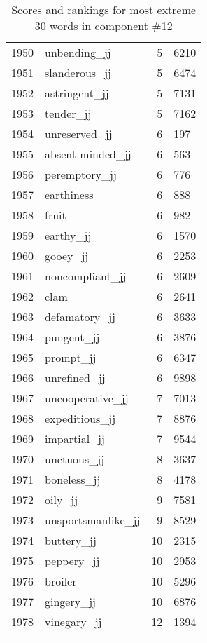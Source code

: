 \begin{longtable}[!htbp]{| rlr@{.}l |}
    1950 & unbending\_jj & 5 & 6210 \\
    1951 & slanderous\_jj & 5 & 6474 \\
    1952 & astringent\_jj & 5 & 7131 \\
    1953 & tender\_jj & 5 & 7162 \\
    1954 & unreserved\_jj & 6 & 197 \\
    1955 & absent-minded\_jj & 6 & 563 \\
    1956 & peremptory\_jj & 6 & 776 \\
    1957 & earthiness & 6 & 888 \\
    1958 & fruit & 6 & 982 \\
    1959 & earthy\_jj & 6 & 1570 \\
    1960 & gooey\_jj & 6 & 2253 \\
    1961 & noncompliant\_jj & 6 & 2609 \\
    1962 & clam & 6 & 2641 \\
    1963 & defamatory\_jj & 6 & 3633 \\
    1964 & pungent\_jj & 6 & 3876 \\
    1965 & prompt\_jj & 6 & 6347 \\
    1966 & unrefined\_jj & 6 & 9898 \\
    1967 & uncooperative\_jj & 7 & 7013 \\
    1968 & expeditious\_jj & 7 & 8876 \\
    1969 & impartial\_jj & 7 & 9544 \\
    1970 & unctuous\_jj & 8 & 3637 \\
    1971 & boneless\_jj & 8 & 4178 \\
    1972 & oily\_jj & 9 & 7581 \\
    1973 & unsportsmanlike\_jj & 9 & 8529 \\
    1974 & buttery\_jj & 10 & 2315 \\
    1975 & peppery\_jj & 10 & 2953 \\
    1976 & broiler & 10 & 5296 \\
    1977 & gingery\_jj & 10 & 6876 \\
    1978 & vinegary\_jj & 12 & 1394 \\
    \hline
    \caption{Scores and rankings for most extreme 30 words in component \#12} \\
\end{longtable}
